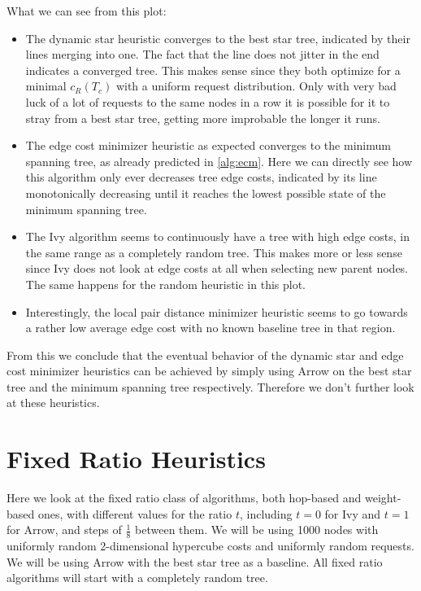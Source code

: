 \documentclass[a4paper, oneside]{discothesis}
\begin{document}
What we can see from this plot:
\begin{itemize}
\item The dynamic star heuristic converges to the best star tree, indicated by their lines merging into one. The fact that the line does not jitter in the end indicates a converged tree. This makes sense since they both optimize for a minimal $c_R(T_c)$ with a uniform request distribution. Only with very bad luck of a lot of requests to the same nodes in a row it is possible for it to stray from a best star tree, getting more improbable the longer it runs.
\item The edge cost minimizer heuristic as expected converges to the minimum spanning tree, as already predicted in \autoref{alg:ecm}. Here we can directly see how this algorithm only ever decreases tree edge costs, indicated by its line monotonically decreasing until it reaches the lowest possible state of the minimum spanning tree.
\item The Ivy algorithm seems to continuously have a tree with high edge costs, in the same range as a completely random tree. This makes more or less sense since Ivy does not look at edge costs at all when selecting new parent nodes. The same happens for the random heuristic in this plot.
\item Interestingly, the local pair distance minimizer heuristic seems to go towards a rather low average edge cost with no known baseline tree in that region.
\end{itemize}

From this we conclude that the eventual behavior of the dynamic star and edge cost minimizer heuristics can be achieved by simply using Arrow on the best star tree and the minimum spanning tree respectively. Therefore we don't further look at these heuristics.

\section{Fixed Ratio Heuristics}

Here we look at the fixed ratio class of algorithms, both hop-based and weight-based ones, with different values for the ratio $t$, including $t=0$ for Ivy and $t=1$ for Arrow, and steps of $\frac{1}{8}$ between them. We will be using 1000 nodes with uniformly random 2-dimensional hypercube costs and uniformly random requests. We will be using Arrow with the best star tree as a baseline. All fixed ratio algorithms will start with a completely random tree.
\end{document}
